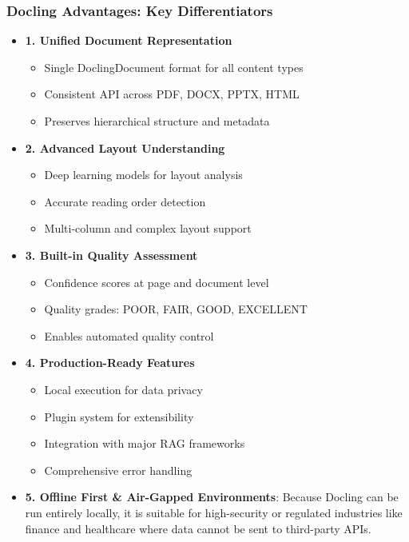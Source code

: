 \begin{frame}[fragile]\frametitle{Docling Advantages: Key Differentiators}
      \begin{itemize}
        \item \textbf{1. Unified Document Representation}
        \begin{itemize}
            \item Single DoclingDocument format for all content types
            \item Consistent API across PDF, DOCX, PPTX, HTML
            \item Preserves hierarchical structure and metadata
        \end{itemize}
        \item \textbf{2. Advanced Layout Understanding}
        \begin{itemize}
            \item Deep learning models for layout analysis
            \item Accurate reading order detection
            \item Multi-column and complex layout support
        \end{itemize}
        \item \textbf{3. Built-in Quality Assessment}
        \begin{itemize}
            \item Confidence scores at page and document level
            \item Quality grades: POOR, FAIR, GOOD, EXCELLENT
            \item Enables automated quality control
        \end{itemize}
        \item \textbf{4. Production-Ready Features}
        \begin{itemize}
            \item Local execution for data privacy
            \item Plugin system for extensibility
            \item Integration with major RAG frameworks
            \item Comprehensive error handling
        \end{itemize}
		\item \textbf{5. Offline First \& Air-Gapped Environments}: Because Docling can be run entirely locally, it is suitable for high-security or regulated industries like finance and healthcare where data cannot be sent to third-party APIs.
      \end{itemize}
\end{frame}



